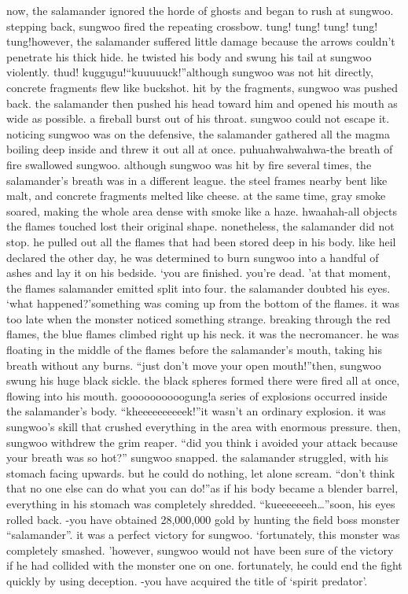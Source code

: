 now, the salamander ignored the horde of ghosts and began to rush at sungwoo.
stepping back, sungwoo fired the repeating crossbow.
tung! tung! tung! tung! tung!however, the salamander suffered little damage because the arrows couldn’t penetrate his thick hide.
he twisted his body and swung his tail at sungwoo violently.
thud! kuggugu!“kuuuuuck!”although sungwoo was not hit directly, concrete fragments flew like buckshot.
 hit by the fragments, sungwoo was pushed back.
 the salamander then pushed his head toward him and opened his mouth as wide as possible.
 a fireball burst out of his throat.
sungwoo could not escape it.
noticing sungwoo was on the defensive, the salamander gathered all the magma boiling deep inside and threw it out all at once.
puhuahwahwahwa-the breath of fire swallowed sungwoo.
 although sungwoo was hit by fire several times, the salamander’s breath was in a different league.
the steel frames nearby bent like malt, and concrete fragments melted like cheese.
at the same time, gray smoke soared, making the whole area dense with smoke like a haze.
hwaahah-all objects the flames touched lost their original shape.
nonetheless, the salamander did not stop.
 he pulled out all the flames that had been stored deep in his body.
 like heil declared the other day, he was determined to burn sungwoo into a handful of ashes and lay it on his bedside.
‘you are finished.
 you’re dead.
’at that moment, the flames salamander emitted split into four.
the salamander doubted his eyes.
‘what happened?’something was coming up from the bottom of the flames.
it was too late when the monster noticed something strange.
breaking through the red flames, the blue flames climbed right up his neck.
it was the necromancer.
 he was floating in the middle of the flames before the salamander’s mouth, taking his breath without any burns.
“just don’t move your open mouth!”then, sungwoo swung his huge black sickle.
 the black spheres formed there were fired all at once, flowing into his mouth.
goooooooooogung!a series of explosions occurred inside the salamander’s body.
“kheeeeeeeeeek!”it wasn’t an ordinary explosion.
 it was sungwoo’s skill that crushed everything in the area with enormous pressure.
then, sungwoo withdrew the grim reaper.
“did you think i avoided your attack because your breath was so hot?” sungwoo snapped.
the salamander struggled, with his stomach facing upwards.
 but he could do nothing, let alone scream.
“don’t think that no one else can do what you can do!”as if his body became a blender barrel, everything in his stomach was completely shredded.
“kueeeeeeeh…”soon, his eyes rolled back.
-you have obtained 28,000,000 gold by hunting the field boss monster “salamander”.
it was a perfect victory for sungwoo.
‘fortunately, this monster was completely smashed.
’however, sungwoo would not have been sure of the victory if he had collided with the monster one on one.
 fortunately, he could end the fight quickly by using deception.
-you have acquired the title of ‘spirit predator’.


